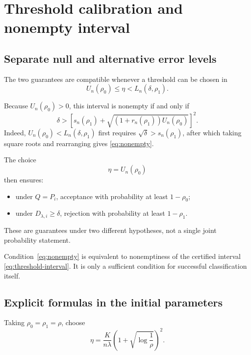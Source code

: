 \documentclass[11pt]{article}
\begin{document}
\section{Threshold calibration and nonempty interval}

\subsection{Separate null and alternative error levels}

The two guarantees are compatible whenever a threshold
can be chosen in
\begin{equation}
    U_n(\rho_0)
    \le\eta<L_n(\delta,\rho_1).
    \label{eq:threshold-interval}
\end{equation}

Because $U_n(\rho_0)>0$, this interval is nonempty if
and only if
\begin{equation}
    \delta>
    \left[
        s_n(\rho_1)
        +
        \sqrt{
            (1+r_n(\rho_1))U_n(\rho_0)
        }
    \right]^2.
    \label{eq:nonempty}
\end{equation}
Indeed, $U_n(\rho_0)<L_n(\delta,\rho_1)$ first requires
$\sqrt\delta>s_n(\rho_1)$, after which taking square
roots and rearranging gives \eqref{eq:nonempty}.

The choice
\[
    \eta=U_n(\rho_0)
\]
then ensures:
\begin{itemize}
    \item under $Q=P_i$, acceptance with probability
    at least $1-\rho_0$;
    \item under $D_{\lambda,i}\ge\delta$, rejection
    with probability at least $1-\rho_1$.
\end{itemize}
These are guarantees under two different hypotheses,
not a single joint probability statement.

Condition~\eqref{eq:nonempty} is equivalent to nonemptiness
of the certified interval \eqref{eq:threshold-interval}.
It is only a sufficient condition for successful
classification itself.

\subsection{Explicit formulas in the initial parameters}

Taking $\rho_0=\rho_1=\rho$, choose
\begin{equation}
    \boxed{
    \eta
    =
    \frac{K}{n\lambda}
    \left(1+\sqrt{\log\frac1\rho}\right)^2.
    }
    \label{eq:explicit-threshold}
\end{equation}
\end{document}
